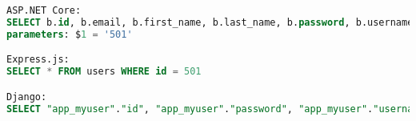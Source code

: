 \begin{lstlisting}[language=SQL,caption={\acrshort{sql} commands for retrieving objects},breaklines=true,label={lst:sqlGet}]
ASP.NET Core:
SELECT b.id, b.email, b.first_name, b.last_name, b.password, b.username FROM users AS b WHERE b.id = $1 LIMIT 2
parameters: $1 = '501'

Express.js:
SELECT * FROM users WHERE id = 501

Django:
SELECT "app_myuser"."id", "app_myuser"."password", "app_myuser"."username", "app_myuser"."first_name", "app_myuser"."last_name", "app_myuser"."email" FROM "app_myuser" WHERE "app_myuser"."id" = 501 LIMIT 21
\end{lstlisting}
